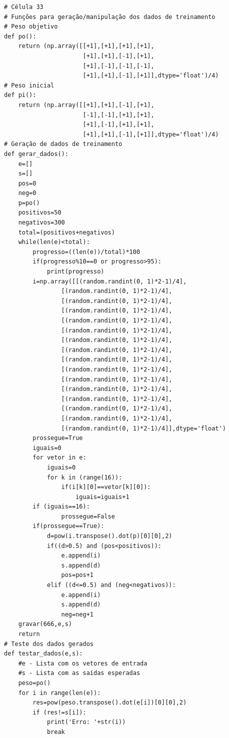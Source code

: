 \begin{verbatim}
# Célula 33
# Funções para geração/manipulação dos dados de treinamento
# Peso objetivo
def po():
    return (np.array([[+1],[+1],[+1],[+1],
                      [+1],[+1],[-1],[+1],
                      [+1],[-1],[-1],[-1],
                      [+1],[+1],[-1],[+1]],dtype='float')/4)
# Peso inicial
def pi():
    return (np.array([[+1],[+1],[-1],[+1],
                      [-1],[-1],[+1],[+1],
                      [+1],[-1],[+1],[+1],
                      [+1],[+1],[-1],[+1]],dtype='float')/4)
# Geração de dados de treinamento
def gerar_dados():
    e=[] 
    s=[] 
    pos=0 
    neg=0  
    p=po()
    positivos=50
    negativos=300
    total=(positivos+negativos)
    while(len(e)<total):
        progresso=((len(e))/total)*100
        if(progresso%10==0 or progresso>95):
            print(progresso)
        i=np.array([[(random.randint(0, 1)*2-1)/4],
                [(random.randint(0, 1)*2-1)/4],
                [(random.randint(0, 1)*2-1)/4],
                [(random.randint(0, 1)*2-1)/4],
                [(random.randint(0, 1)*2-1)/4],
                [(random.randint(0, 1)*2-1)/4],                    
                [(random.randint(0, 1)*2-1)/4],
                [(random.randint(0, 1)*2-1)/4],
                [(random.randint(0, 1)*2-1)/4],
                [(random.randint(0, 1)*2-1)/4],
                [(random.randint(0, 1)*2-1)/4],
                [(random.randint(0, 1)*2-1)/4],                    
                [(random.randint(0, 1)*2-1)/4],
                [(random.randint(0, 1)*2-1)/4],
                [(random.randint(0, 1)*2-1)/4],
                [(random.randint(0, 1)*2-1)/4]],dtype='float') 
        prossegue=True 
        iguais=0
        for vetor in e:
            iguais=0    
            for k in (range(16)):     
                if(i[k][0]==vetor[k][0]):
                    iguais=iguais+1
        if (iguais==16):          
                prossegue=False            
        if(prossegue==True):         
            d=pow(i.transpose().dot(p)[0][0],2)
            if((d>0.5) and (pos<positivos)):
                e.append(i)
                s.append(d)
                pos=pos+1
            elif ((d<=0.5) and (neg<negativos)):
                e.append(i)
                s.append(d)
                neg=neg+1
    gravar(666,e,s)
    return
# Teste dos dados gerados
def testar_dados(e,s):
    #e - Lista com os vetores de entrada
    #s - Lista com as saídas esperadas
    peso=po()
    for i in range(len(e)):
        res=pow(peso.transpose().dot(e[i])[0][0],2)
        if (res!=s[i]):
            print('Erro: '+str(i))
            break

\end{verbatim}
